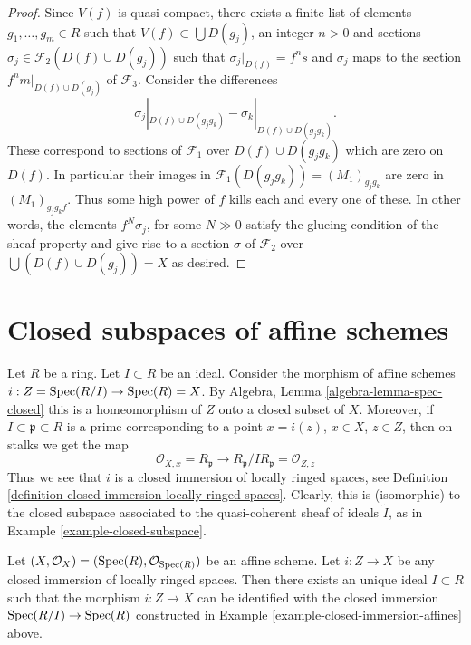\begin{proof}
\medskip\noindent
Since $V(f)$ is quasi-compact, there exists a finite list
of elements $g_1, \ldots, g_m \in R$ such that
$V(f) \subset \bigcup D(g_j)$, an integer $n > 0$ and sections
$\sigma_j \in \mathcal{F}_2(D(f) \cup D(g_j))$ such that
$\sigma_j|_{D(f)} = f^n s$ and $\sigma_j$ maps to the section
$f^nm|_{D(f) \cup D(g_j)}$ of $\mathcal{F}_3$.
Consider the differences
$$
\sigma_j|_{D(f) \cup D(g_jg_k)}
-
\sigma_k|_{D(f) \cup D(g_jg_k)}.
$$
These correspond to sections of $\mathcal{F}_1$
over $D(f) \cup D(g_jg_k)$ which are zero
on $D(f)$. In particular their images in
$\mathcal{F}_1(D(g_jg_k)) = (M_1)_{g_jg_k}$
are zero in $(M_1)_{g_jg_kf}$.
Thus some high power of $f$ kills each and every one of these.
In other words, the elements $f^N \sigma_j$, for some $N \gg 0$
satisfy the glueing condition of the sheaf property and
give rise to a section $\sigma $ of $\mathcal{F}_2$
over $\bigcup (D(f) \cup D(g_j)) = X$ as desired.
\end{proof}







\section{Closed subspaces of affine schemes}
\label{section-closed-in-affine}

\begin{example}
\label{example-closed-immersion-affines}
Let $R$ be a ring.
Let $I \subset R$ be an ideal.
Consider the morphism of affine schemes
$i : Z = \mathop{\rm Spec}(R/I) \to \mathop{\rm Spec}(R) = X$.
By Algebra, Lemma \ref{algebra-lemma-spec-closed}
this is a homeomorphism of $Z$ onto a closed
subset of $X$. Moreover, if $I \subset \mathfrak p \subset R$
is a prime corresponding to a point $x = i(z)$, $x \in X$,
$z \in Z$, then on stalks we get the map
$$
\mathcal{O}_{X, x} = R_{\mathfrak p}
\longrightarrow
R_{\mathfrak p}/IR_{\mathfrak p} = \mathcal{O}_{Z, z}
$$
Thus we see that $i$ is a closed immersion of locally ringed spaces,
see Definition \ref{definition-closed-immersion-locally-ringed-spaces}.
Clearly, this is (isomorphic) to the closed subspace associated
to the quasi-coherent sheaf of ideals $\widetilde I$, as in
Example \ref{example-closed-subspace}.
\end{example}

\begin{lemma}
\label{lemma-closed-immersion-affine-case}
Let $(X, \mathcal{O}_X) = (\mathop{\rm Spec}(R), \mathcal{O}_{\mathop{\rm Spec}(R)})$
be an affine scheme. Let $i : Z \to X$ be any closed immersion
of locally ringed spaces. Then there exists an unique ideal
$I \subset R$ such that the morphism $i : Z \to X$ can be identified
with the closed immersion $\mathop{\rm Spec}(R/I) \to \mathop{\rm Spec}(R)$
constructed in Example \ref{example-closed-immersion-affines} above.
\end{lemma}

